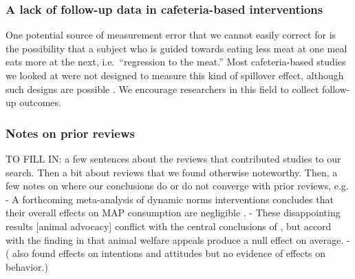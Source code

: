 \documentclass[sn-nature,pdflatex]{sn-jnl}
\begin{document}
\subsubsection{A lack of follow-up data in cafeteria-based
interventions}\label{a-lack-of-follow-up-data-in-cafeteria-based-interventions}

One potential source of measurement error that we cannot easily correct
for is the possibility that a subject who is guided towards eating less
meat at one meal eats more at the next, i.e.~``regression to the meat.''
Most cafeteria-based studies we looked at were not designed to measure
this kind of spillover effect, although such designs are possible
\citep{vocski2024}. We encourage researchers in this field to collect
follow-up outcomes.

\subsubsection{Notes on prior reviews}\label{notes-on-prior-reviews}

TO FILL IN: a few sentences about the reviews that contributed studies
to our search. Then a bit about reviews that we found otherwise
noteworthy. Then, a few notes on where our conclusions do or do not
converge with prior reviews, e.g. - A forthcoming meta-analysis of
dynamic norms interventions concludes that their overall effects on MAP
consumption are negligible \citep{Weikertova2024}. - These disappointing
results {[}animal advocacy{]} conflict with the central conclusions of
\citep{mathur2021effectiveness}, but accord with the finding in
\citep{DiGennaro2024} that animal welfare appeals produce a null effect
on average. - (\citep{bianchi2018conscious} also found effects on
intentions and attitudes but no evidence of effects on behavior.)

\newpage

\renewcommand\refname{References}

\end{document}

